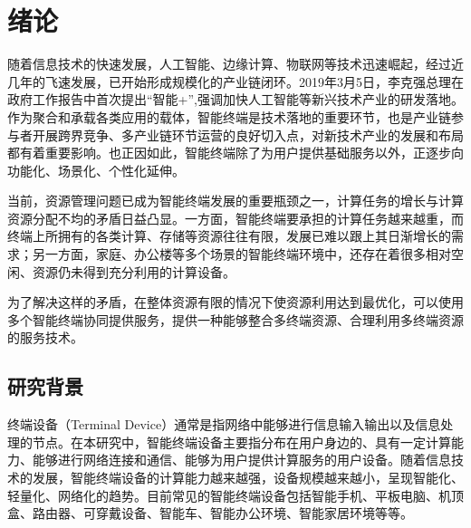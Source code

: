 \chapter{绪论}\label{chap:introduction}

随着信息技术的快速发展，人工智能、边缘计算、物联网等技术迅速崛起，经过近几年的飞速发展，已开始形成规模化的产业链闭环。2019年3月5日，李克强总理在政府工作报告中首次提出“智能+”,强调加快人工智能等新兴技术产业的研发落地。作为聚合和承载各类应用的载体，智能终端是技术落地的重要环节，也是产业链参与者开展跨界竞争、多产业链环节运营的良好切入点，对新技术产业的发展和布局都有着重要影响。也正因如此，智能终端除了为用户提供基础服务以外，正逐步向功能化、场景化、个性化延伸。

当前，资源管理问题已成为智能终端发展的重要瓶颈之一，计算任务的增长与计算资源分配不均的矛盾日益凸显。一方面，智能终端要承担的计算任务越来越重，而终端上所拥有的各类计算、存储等资源往往有限，发展已难以跟上其日渐增长的需求；另一方面，家庭、办公楼等多个场景的智能终端环境中，还存在着很多相对空闲、资源仍未得到充分利用的计算设备。

为了解决这样的矛盾，在整体资源有限的情况下使资源利用达到最优化，可以使用多个智能终端协同提供服务，提供一种能够整合多终端资源、合理利用多终端资源的服务技术。



\section{研究背景}

终端设备（Terminal Device）通常是指网络中能够进行信息输入输出以及信息处理的节点\citep{2004支持普适计算的智能终端服务及设备管理技术研究}。在本研究中，智能终端设备主要指分布在用户身边的、具有一定计算能力、能够进行网络连接和通信、能够为用户提供计算服务的用户设备。随着信息技术的发展，智能终端设备的计算能力越来越强，设备规模越来越小，呈现智能化、轻量化、网络化的趋势。目前常见的智能终端设备包括智能手机、平板电脑、机顶盒、路由器、可穿戴设备、智能车、智能办公环境、智能家居环境等等。

